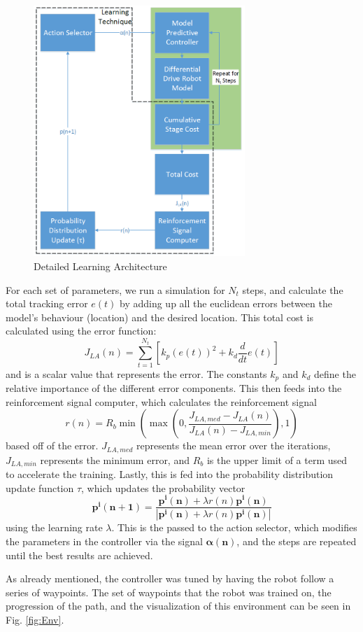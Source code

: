 \documentclass[conference]{IEEEtran}
\begin{document}
\begin{figure}[tb]
\centering
\includegraphics[width=80mm]{Learn.PNG}
\caption{Detailed Learning Architecture}
\label{fig:Learn}
\end{figure} 

For each set of parameters, we run a simulation for $N_{t}$ steps, and calculate the total tracking error $e(t)$ by adding up all the euclidean errors between the model's behaviour (location) and the desired location. This total cost is calculated using the error function: $$J_{LA}(n) = \sum_{t=1}^{N_{t}}[k_{p}(e(t))^2+k_{d}\frac{d}{dt}e(t)]$$ and is a scalar value that represents the error. The constants $k_{p}$ and $k_{d}$ define the relative importance of the different error components. This then feeds into the reinforcement signal computer, which calculates the reinforcement signal 
$$r(n) = R_{b}\min(\max(0, \frac{J_{LA,med}-J_{LA}(n)}{J_{LA}(n)-J_{LA,min}}), 1)$$ 
based off of the error. $J_{LA,med}$ represents the mean error over the iterations, $J_{LA,min}$ represents the minimum error, and $R_{b}$ is the upper limit of a term used to accelerate the training. Lastly, this is fed into the probability distribution update function $\tau$, which updates the probability vector $$\mathbf{p^{i}(n+1)} = \frac{\mathbf{p^{i}(n)}+\lambda r(n)\mathbf{p^{i}(n)}}{|\mathbf{p^{i}(n)}+\lambda r(n)\mathbf{p^{i}(n)}|}$$ using the learning rate $\lambda$. This is the passed to the action selector, which modifies the parameters in the controller via the signal $\mathbf{\alpha(n)}$, and the steps are repeated until the best results are achieved. 

As already mentioned, the controller was tuned by having the robot follow a series of waypoints. The set of waypoints that the robot was trained on, the progression of the path, and the visualization of this environment can be seen in Fig. \ref{fig:Env}.
\end{document}

